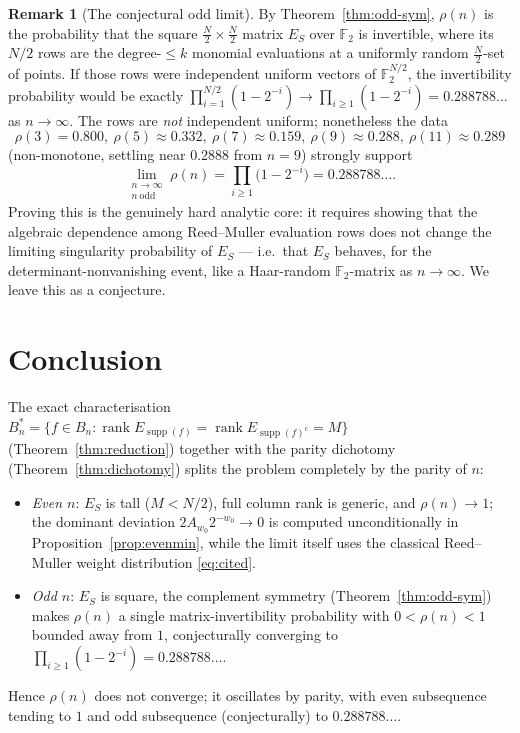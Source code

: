\documentclass{amsart}
\theoremstyle{definition}
\newtheorem{remark}[theorem]{Remark}
\DeclareMathOperator{\supp}{supp}
\DeclareMathOperator{\rank}{rank}
\newcommand{\F}{\mathbb{F}}
\begin{document}
\begin{remark}[The conjectural odd limit]\label{rem:oddlimit}
By Theorem~\ref{thm:odd-sym}, $\rho(n)$ is the probability that the square
$\tfrac N2\times\tfrac N2$ matrix $E_S$ over $\F_2$ is invertible, where
its $N/2$ rows are the degree-$\le k$ monomial evaluations at a uniformly
random $\tfrac N2$-set of points. If those rows were independent uniform
vectors of $\F_2^{N/2}$, the invertibility probability would be exactly
$\prod_{i=1}^{N/2}(1-2^{-i})\to\prod_{i\ge1}(1-2^{-i})=0.288788\ldots$ as
$n\to\infty$. The rows are \emph{not} independent uniform; nonetheless the
data
\[
\rho(3)=0.800,\ \rho(5)\approx0.332,\ \rho(7)\approx0.159,\
\rho(9)\approx0.288,\ \rho(11)\approx0.289
\]
(non-monotone, settling near $0.2888$ from $n=9$) strongly support
\[
\lim_{\substack{n\to\infty\\ n\ \mathrm{odd}}}\rho(n)
=\prod_{i\ge1}\bigl(1-2^{-i}\bigr)=0.288788\ldots .
\]
Proving this is the genuinely hard analytic core: it requires showing that
the algebraic dependence among Reed--Muller evaluation rows does not
change the limiting singularity probability of $E_S$ --- i.e.\ that $E_S$
behaves, for the determinant-nonvanishing event, like a Haar-random
$\F_2$-matrix as $n\to\infty$. We leave this as a conjecture.
\end{remark}

\section{Conclusion}

The exact characterisation $B_n^*=\{f\in B_n:\rank E_{\supp(f)}=\rank
E_{\supp(f)^c}=M\}$ (Theorem~\ref{thm:reduction}) together with the parity
dichotomy (Theorem~\ref{thm:dichotomy}) splits the problem completely by
the parity of $n$:
\begin{itemize}
\item \emph{Even $n$}: $E_S$ is tall ($M<N/2$), full column rank is
generic, and $\rho(n)\to1$; the dominant deviation
$2A_{w_0}2^{-w_0}\to0$ is computed unconditionally in
Proposition~\ref{prop:evenmin}, while the limit itself uses the classical
Reed--Muller weight distribution \eqref{eq:cited}.
\item \emph{Odd $n$}: $E_S$ is square, the complement symmetry
(Theorem~\ref{thm:odd-sym}) makes $\rho(n)$ a single matrix-invertibility
probability with $0<\rho(n)<1$ bounded away from $1$, conjecturally
converging to $\prod_{i\ge1}(1-2^{-i})=0.288788\ldots$.
\end{itemize}
Hence $\rho(n)$ does not converge; it oscillates by parity, with even
subsequence tending to $1$ and odd subsequence (conjecturally) to
$0.288788\ldots$.
\end{document}
